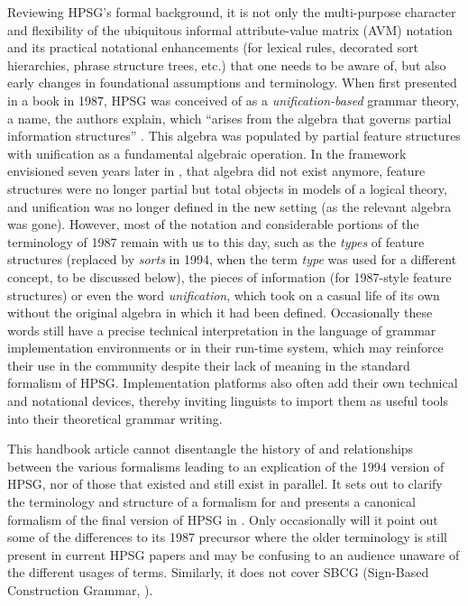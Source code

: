 \documentclass[output=paper
 	        ,biblatex
                ,babelshorthands
                ,newtxmath
                ,draftmode
                ,colorlinks, citecolor=brown
]{langscibook}
\begin{document}
Reviewing\label{formal:page-unification-start} HPSG's formal background,
it is not only the multi-purpose character and flexibility of the ubiquitous informal attribute-value matrix (AVM) notation and its
practical notational enhancements (for lexical rules, decorated sort
hierarchies, phrase structure trees, etc.) that one needs to be
aware of, but also early changes in
foundational assumptions and terminology.
When first presented in a book in 1987, HPSG was conceived of as a
\emph{unification-based} grammar theory, a name, the authors
explain, which ``arises from the algebra that governs partial
information structures'' \citep[7]{PollardSag1987}. This algebra was
populated by partial feature structures with unification as a
fundamental algebraic operation. In the framework envisioned seven
years later in \citet{PollardSag1994},
that algebra did not exist anymore, feature structures were no longer
partial but total objects in models of a logical theory, and
unification was no longer defined in the new setting (as the relevant
algebra was gone). However, most of the notation and considerable
portions of the terminology of 1987 remain with us to this day, such as the
\emph{types} of feature structures (replaced by
\emph{sorts} in 1994,
when the term \emph{type} was used for a different concept, to be
discussed below), the pieces of information (for 1987-style feature
structures) or even the word \emph{unification}, which took on a
casual life of its own without the original algebra in
which it had been defined. Occasionally these words still have a
precise technical interpretation in the language of grammar
implementation environments or in their run-time system, which may
reinforce their use in the community despite their lack of meaning in
the standard formalism of HPSG. Implementation platforms also often add
their own technical and notational devices, thereby
inviting linguists to import them as useful tools into their theoretical grammar
writing.\label{formal:page-unification-end}



This handbook article cannot disentangle the history of and relationships
between the various formalisms leading to an explication of the
1994 version of HPSG, nor of those that existed and still exist in
parallel. It sets out to clarify the terminology and
structure of a formalism for \cite{PollardSag1994} and
presents a canonical formalism of the final version of
HPSG in \cite{PollardSag1994}. Only occasionally will it point out some of
the differences to its 1987 precursor where
the older terminology is still present in current HPSG papers and
may be confusing to an audience unaware of the different
usages of terms. Similarly, it does not cover SBCG (Sign-Based
Construction Grammar, ).
\end{document}
